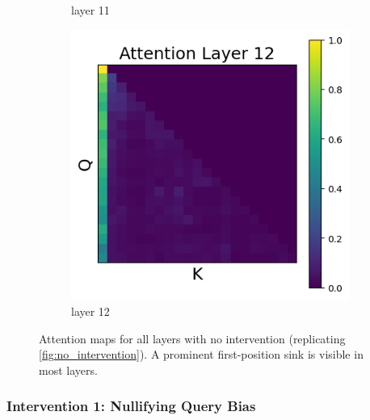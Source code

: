 \documentclass[11pt]{article}
\begin{document}
\begin{figure}[t]
\begin{subfigure}[t]{0.24\textwidth}
    \caption{layer 11}
  \end{subfigure}\hfill
  \begin{subfigure}[t]{0.24\textwidth}
    \centering
    \includegraphics[width=1.4\columnwidth]{figures/no_intervention/layer_12.png}
    \caption{layer 12}
  \end{subfigure}\hfill

  \caption{Attention maps for all layers with no intervention (replicating \cref{fig:no_intervention}). A prominent first-position sink is visible in most layers.}
  \label{fig:app_no_intervention_all_layers}
\end{figure}


\subsubsection{Intervention 1: Nullifying Query Bias}\label{app:intervention1}
\end{document}
